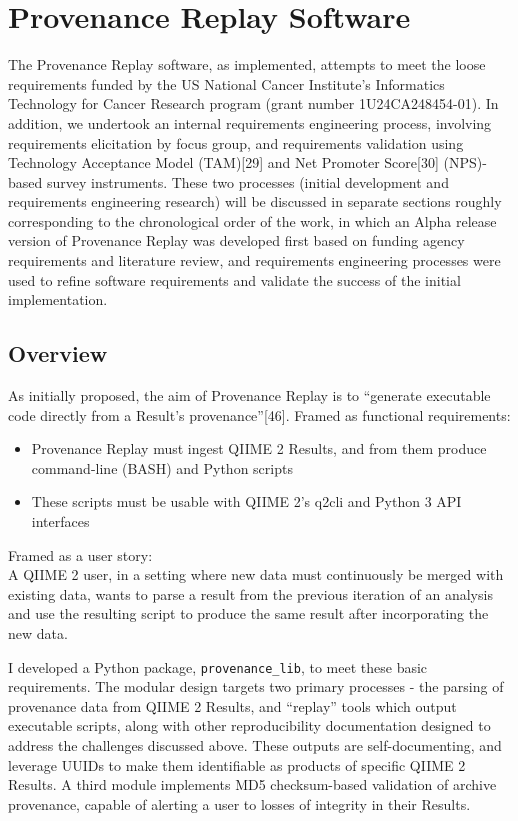 \chapter{Provenance Replay Software}
The Provenance Replay software, as implemented, attempts to meet the loose
requirements funded by the US National Cancer Institute’s Informatics Technology
for Cancer Research program (grant number 1U24CA248454-01). In addition, we
undertook an internal requirements engineering process, involving requirements
elicitation by focus group, and requirements validation using Technology
Acceptance Model (TAM)[29] and Net Promoter Score[30] (NPS)-based survey
instruments. These two processes (initial development and requirements
engineering research) will be discussed in separate sections roughly
corresponding to the chronological order of the work, in which an Alpha release
version of Provenance Replay was developed first based on funding agency
requirements and literature review, and requirements engineering processes were
used to refine software requirements and validate the success of the initial
implementation. 

\section{Overview}

As initially proposed, the aim of Provenance Replay is to “generate executable
code directly from a Result’s provenance”[46]. Framed as functional
requirements:
\begin{itemize}
    \item Provenance Replay must ingest QIIME 2 Results, and from them produce command-line (BASH) and Python scripts
    \item These scripts must be usable with QIIME 2’s q2cli and Python 3 API interfaces
\end{itemize}

\noindent Framed as a user story: \\
A QIIME 2 user, in a setting where new data must continuously be
merged with existing data, wants to parse a result from the previous iteration
of an analysis and use the resulting script to produce the same result after
incorporating the new data. 

I developed a Python package, \texttt{provenance\_lib}, to meet these basic
requirements.  The modular design targets two primary processes - the parsing of
provenance data from QIIME 2 Results, and “replay” tools which output executable
scripts, along with other reproducibility documentation designed to address the
challenges discussed above. These outputs are self-documenting, and leverage
UUIDs to make them identifiable as products of specific QIIME 2 Results. A third
module implements MD5 checksum-based validation of archive provenance, capable
of alerting a user to losses of integrity in their Results. 

